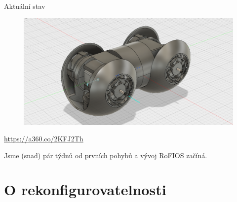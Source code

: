 \documentclass{beamer}
\begin{document}
\begin{frame}{Aktuální stav}
    \begin{figure}
        \centering
        \includegraphics[width=\textwidth]{img/rofi3}
    \end{figure}

    \url{https://a360.co/2KFJ2Th}

    Jsme (snad) pár týdnů od prvních pohybů a vývoj RoFIOS začíná.
\end{frame}

\section{O rekonfigurovatelnosti}
\end{document}
